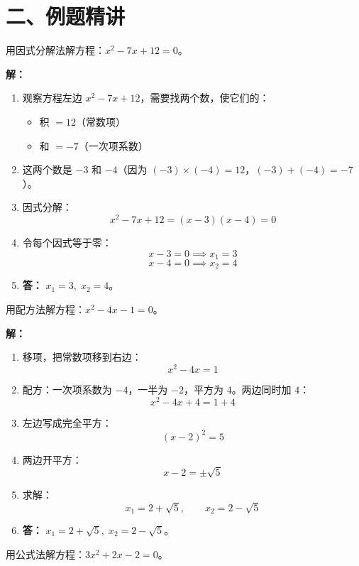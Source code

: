 \documentclass[12pt, a4paper]{ctexart}
\begin{document}
\section*{\textcolor{examorange}{二、例题精讲}}

\begin{examplebox}[【例题 1】因式分解法解方程]
用因式分解法解方程：$x^2 - 7x + 12 = 0$。
\end{examplebox}

\textbf{解：}
\begin{enumerate}[leftmargin=2em]
  \item 观察方程左边 $x^2 - 7x + 12$，需要找两个数，使它们的：
  \begin{itemize}
    \item 积 $= 12$（常数项）
    \item 和 $= -7$（一次项系数）
  \end{itemize}
  \item 这两个数是 $-3$ 和 $-4$（因为 $(-3) \times (-4) = 12$，$(-3) + (-4) = -7$）。
  \item 因式分解：
  \[
  x^2 - 7x + 12 = (x - 3)(x - 4) = 0
  \]
  \item 令每个因式等于零：
  \[
  x - 3 = 0 \implies x_1 = 3
  \]
  \[
  x - 4 = 0 \implies x_2 = 4
  \]
  \item \textbf{答：} $x_1 = 3,\; x_2 = 4$。
\end{enumerate}

\begin{examplebox}[【例题 2】配方法解方程]
用配方法解方程：$x^2 - 4x - 1 = 0$。
\end{examplebox}

\textbf{解：}
\begin{enumerate}[leftmargin=2em]
  \item 移项，把常数项移到右边：
  \[
  x^2 - 4x = 1
  \]
  \item 配方：一次项系数为 $-4$，一半为 $-2$，平方为 $4$。两边同时加 $4$：
  \[
  x^2 - 4x + 4 = 1 + 4
  \]
  \item 左边写成完全平方：
  \[
  (x - 2)^2 = 5
  \]
  \item 两边开平方：
  \[
  x - 2 = \pm\sqrt{5}
  \]
  \item 求解：
  \[
  x_1 = 2 + \sqrt{5}, \qquad x_2 = 2 - \sqrt{5}
  \]
  \item \textbf{答：} $x_1 = 2 + \sqrt{5},\; x_2 = 2 - \sqrt{5}$。
\end{enumerate}

\begin{examplebox}[【例题 3】公式法解方程]
用公式法解方程：$3x^2 + 2x - 2 = 0$。
\end{examplebox}
\end{document}
